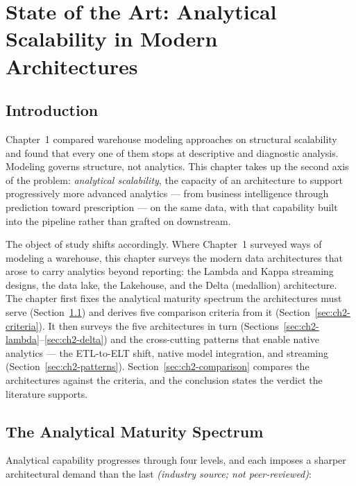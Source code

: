 \chapter{State of the Art: Analytical Scalability in Modern Architectures}

\section*{Introduction}

Chapter~1 compared warehouse modeling approaches on structural scalability and found that every one of them stops at descriptive and diagnostic analysis. Modeling governs structure, not analytics. This chapter takes up the second axis of the problem: \textit{analytical scalability}, the capacity of an architecture to support progressively more advanced analytics --- from business intelligence through prediction toward prescription --- on the same data, with that capability built into the pipeline rather than grafted on downstream.

The object of study shifts accordingly. Where Chapter~1 surveyed ways of modeling a warehouse, this chapter surveys the modern data architectures that arose to carry analytics beyond reporting: the Lambda and Kappa streaming designs, the data lake, the Lakehouse, and the Delta (medallion) architecture. The chapter first fixes the analytical maturity spectrum the architectures must serve (Section~\ref{sec:ch2-maturity}) and derives five comparison criteria from it (Section~\ref{sec:ch2-criteria}). It then surveys the five architectures in turn (Sections~\ref{sec:ch2-lambda}--\ref{sec:ch2-delta}) and the cross-cutting patterns that enable native analytics --- the ETL-to-ELT shift, native model integration, and streaming (Section~\ref{sec:ch2-patterns}). Section~\ref{sec:ch2-comparison} compares the architectures against the criteria, and the conclusion states the verdict the literature supports.

\section{The Analytical Maturity Spectrum}
\label{sec:ch2-maturity}

Analytical capability progresses through four levels, and each imposes a sharper architectural demand than the last \parencite{gartner2012ascendancy} \textit{(industry source; not peer-reviewed)}:

